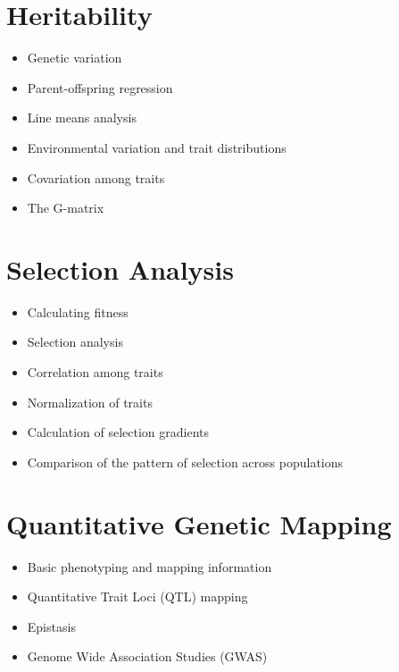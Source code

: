\documentclass[
]{book}
\providecommand{\tightlist}{%
  \setlength{\itemsep}{0pt}\setlength{\parskip}{0pt}}
\begin{document}
\hypertarget{heritability}{%
\section{Heritability}\label{heritability}}

\begin{itemize}
\tightlist
\item
  Genetic variation
\item
  Parent-offspring regression
\item
  Line means analysis
\item
  Environmental variation and trait distributions
\item
  Covariation among traits
\item
  The G-matrix
\end{itemize}

\hypertarget{selection-analysis}{%
\section{Selection Analysis}\label{selection-analysis}}

\begin{itemize}
\tightlist
\item
  Calculating fitness
\item
  Selection analysis
\item
  Correlation among traits
\item
  Normalization of traits
\item
  Calculation of selection gradients
\item
  Comparison of the pattern of selection across populations
\end{itemize}

\hypertarget{quantitative-genetic-mapping}{%
\section{Quantitative Genetic Mapping}\label{quantitative-genetic-mapping}}

\begin{itemize}
\tightlist
\item
  Basic phenotyping and mapping information
\item
  Quantitative Trait Loci (QTL) mapping
\item
  Epistasis
\item
  Genome Wide Association Studies (GWAS)
\end{itemize}
\end{document}
